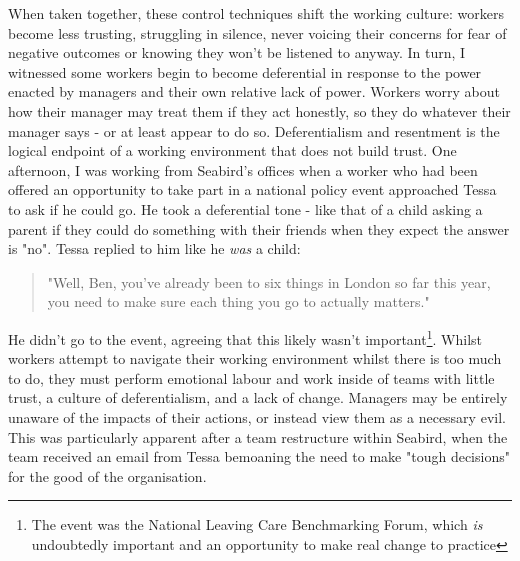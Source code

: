 When taken together, these control techniques shift the working culture: workers become less trusting, struggling in silence, never voicing their concerns for fear of negative outcomes or knowing they won’t be listened to anyway. In turn, I witnessed some workers begin to become deferential in response to the power enacted by managers and their own relative lack of power. Workers worry about how their manager may treat them if they act honestly, so they do whatever their manager says - or at least appear to do so. Deferentialism and resentment is the logical endpoint of a working environment that does not build trust. One afternoon, I was working from Seabird’s offices when a worker who had been offered an opportunity to take part in a national policy event approached Tessa to ask if he could go. He took a deferential tone - like that of a child asking a parent if they could do something with their friends when they expect the answer is "no". Tessa replied to him like he \textit{was} a child:
\begin{quote}
"Well, Ben, you've already been to six things in London so far this year, you need to make sure each thing you go to actually matters."
\end{quote}
He didn’t go to the event, agreeing that this likely wasn't important\footnote{The event was the National Leaving Care Benchmarking Forum, which \emph{is} undoubtedly important and an opportunity to make real change to practice}. Whilst workers attempt to navigate their working environment whilst there is too much to do, they must perform emotional labour and work inside of teams with little trust, a culture of deferentialism, and a lack of change. Managers may be entirely  unaware of the impacts of their actions, or instead view them as a necessary evil. This was particularly apparent after a team restructure within Seabird, when the team received an email from Tessa bemoaning the need to make "tough decisions" for the good of the organisation.

